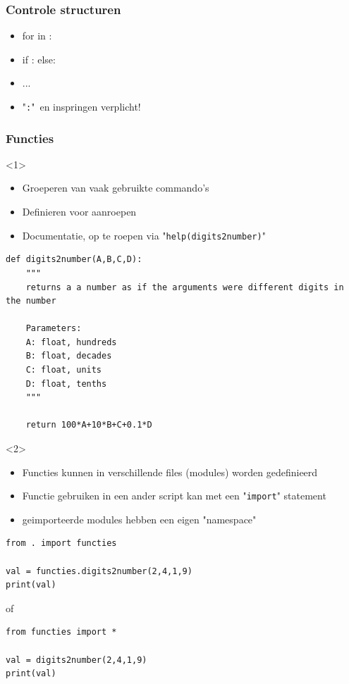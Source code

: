 \documentclass[t]{beamer}
\begin{document}
\begin{frame}
	\frametitle{Controle structuren}
	
	\begin{itemize}
		\item for in :
		\item if : else:  
		\item ...
		\item "\lstinline{:}"\ en inspringen verplicht!
	\end{itemize}
	
	\vspace{1cm}
		
	
\end{frame}
\begin{frame}[fragile]
	\frametitle{Functies}
\begin{onlyenv}<1>
	\begin{itemize}
		\item Groeperen van vaak gebruikte commando's
		\item Definieren voor aanroepen
		\item Documentatie, op te roepen via "\lstinline{help(digits2number)}"
	\end{itemize}

	\begin{lstlisting}
def digits2number(A,B,C,D):
	"""
	returns a a number as if the arguments were different digits in the number
	
	Parameters:
	A: float, hundreds
	B: float, decades
	C: float, units
	D: float, tenths
	"""
	
	return 100*A+10*B+C+0.1*D
	\end{lstlisting}
\end{onlyenv}
\begin{onlyenv}<2>
	\begin{itemize}
		\item Functies kunnen in verschillende files (modules) worden gedefinieerd
		\item Functie gebruiken in een ander script kan met een "\lstinline{import}" statement
		\item geimporteerde modules hebben een eigen "namespace"
	\end{itemize}
	
	\vspace{0.2cm}
	\begin{lstlisting}
from . import functies

val = functies.digits2number(2,4,1,9)
print(val)
	\end{lstlisting}
of
	\begin{lstlisting}
from functies import *

val = digits2number(2,4,1,9)
print(val)
	\end{lstlisting}
\end{onlyenv}
\end{frame}
\end{document}

